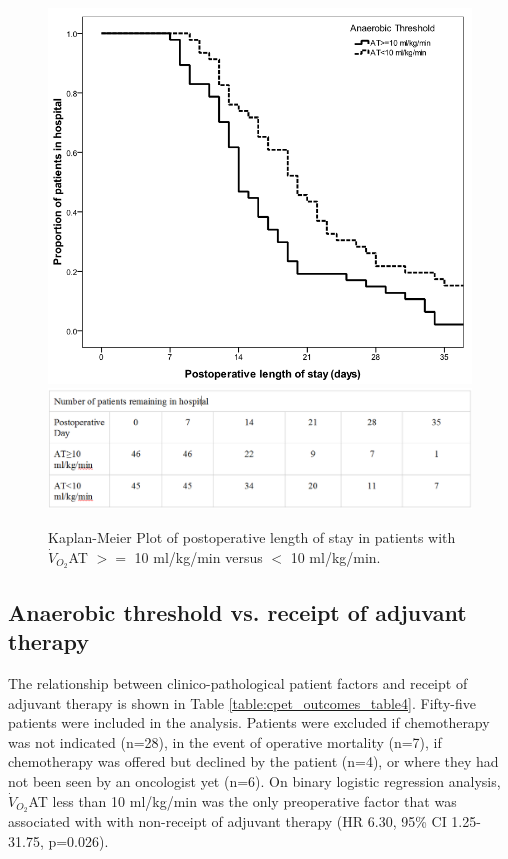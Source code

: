 \begin{figure}[h]
\centering
\includegraphics[width=0.8\linewidth]{Figures/cpet_outcomes_km_at_los}
\includegraphics[width=1\linewidth]{Figures/cpet_outcomes_km_at_los_table} %
\caption{Kaplan-Meier Plot of postoperative length of stay in patients with $\dot{V}_{O_2}$AT $>=$ 10 ml/kg/min versus $<$ 10 ml/kg/min.}
\label{fig:cpet_outcomes_km_at_los}
\end{figure}

\subsection{Anaerobic threshold vs. receipt of adjuvant therapy}
The relationship between clinico-pathological patient factors and receipt of adjuvant therapy is shown in Table \ref{table:cpet_outcomes_table4}. 
Fifty-five patients were included in the analysis. 
Patients were excluded if chemotherapy was not indicated (n=28), in the event of operative mortality (n=7), if chemotherapy was offered but declined by the patient (n=4), or where they had not been seen by an oncologist yet (n=6). 
On binary logistic regression analysis, $\dot{V}_{O_2}$AT less than 10 ml/kg/min was the only preoperative factor that was associated with with non-receipt of adjuvant therapy (HR 6.30, 95\% CI 1.25-31.75, p=0.026). 


